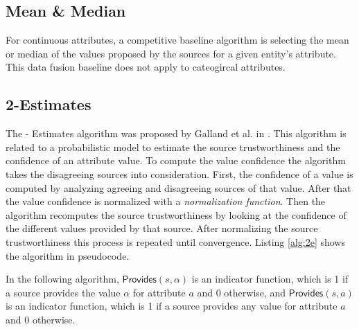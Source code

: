 \documentclass{acm_proc_article-sp}
\begin{document}
\subsection{Mean \& Median}

For continuous attributes, a competitive baseline algorithm is selecting the mean or median of the values proposed by the sources for a given entity's attribute. This data fusion baseline does not apply to cateogircal attributes. 


\subsection{2-Estimates}
The {- Estimates} algorithm was proposed by Galland et al. in \cite{galland:corro}. This algorithm is related to a probabilistic model to estimate the source trustworthiness and the confidence of an attribute value. To compute the value confidence the algorithm takes the disagreeing sources into consideration. First, the confidence of a value is computed by analyzing agreeing and disagreeing sources of that value. After that the value confidence is normalized with a \emph{normalization function}. Then the algorithm recomputes the source trustworthiness by looking at the confidence of the different values provided by that source. After normalizing the source trustworthiness this process is repeated until convergence. Listing \ref{alg:2e} shows the algorithm in pseudocode.

In the following algorithm, $\mathsf{Provides}(s,\alpha)$ is an indicator function, which is 1 if a source provides the value $\alpha$ for attribute $a$ and 0 otherwise, and $\mathsf{Provides}(s,a)$ is an indicator function, which is 1 if a source provides any value for attribute $a$ and 0 otherwise. 
\end{document}
